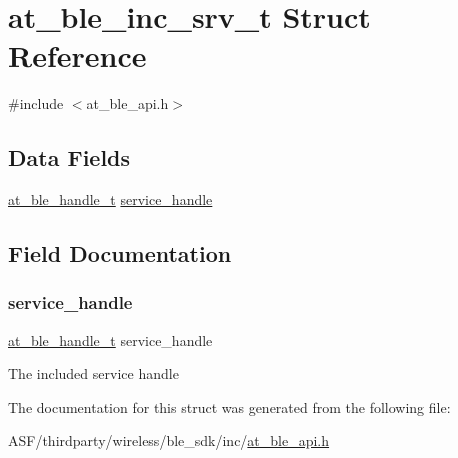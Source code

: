 \hypertarget{structat__ble__inc__srv__t}{}\section{at\+\_\+ble\+\_\+inc\+\_\+srv\+\_\+t Struct Reference}
\label{structat__ble__inc__srv__t}


{\ttfamily \#include $<$at\+\_\+ble\+\_\+api.\+h$>$}

\subsection*{Data Fields}
\begin{DoxyCompactItemize}
\item 
\mbox{\hyperlink{at__ble__api_8h_abd23646d0c662860741f787efc8456f2}{at\+\_\+ble\+\_\+handle\+\_\+t}} \mbox{\hyperlink{structat__ble__inc__srv__t_a0c715587b85af2e83ed074e596f79f32}{service\+\_\+handle}}
\end{DoxyCompactItemize}


\subsection{Field Documentation}
\mbox{\label{structat__ble__inc__srv__t_a0c715587b85af2e83ed074e596f79f32}} 
\subsubsection{\texorpdfstring{service\_handle}{service\_handle}}
{\footnotesize\ttfamily \mbox{\hyperlink{at__ble__api_8h_abd23646d0c662860741f787efc8456f2}{at\+\_\+ble\+\_\+handle\+\_\+t}} service\+\_\+handle}

The included service handle 

The documentation for this struct was generated from the following file\+:\begin{DoxyCompactItemize}
\item 
A\+S\+F/thirdparty/wireless/ble\+\_\+sdk/inc/\mbox{\hyperlink{at__ble__api_8h}{at\+\_\+ble\+\_\+api.\+h}}\end{DoxyCompactItemize}

